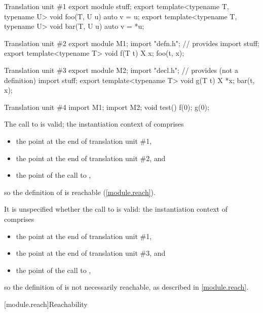 \pnum
\begin{example}
\begin{codeblocktu}{Translation unit \#1}
export module stuff;
export template<typename T, typename U> void foo(T, U u) { auto v = u; }
export template<typename T, typename U> void bar(T, U u) { auto v = *u; }
\end{codeblocktu}

\begin{codeblocktu}{Translation unit \#2}
export module M1;
import "defn.h";        // provides 
import stuff;
export template<typename T> void f(T t) {
  X x;
  foo(t, x);
}
\end{codeblocktu}

\begin{codeblocktu}{Translation unit \#3}
export module M2;
import "decl.h";        // provides  (not a definition)
import stuff;
export template<typename T> void g(T t) {
  X *x;
  bar(t, x);
}
\end{codeblocktu}

\begin{codeblocktu}{Translation unit \#4}
import M1;
import M2;
void test() {
  f(0);
  g(0);
}
\end{codeblocktu}
The call to  is valid;
the instantiation context of  comprises
\begin{itemize}
\item the point at the end of translation unit \#1,
\item the point at the end of translation unit \#2, and
\item the point of the call to ,
\end{itemize}
so the definition of  is reachable (\ref{module.reach}).

It is unspecified whether the call to  is valid:
the instantiation context of  comprises
\begin{itemize}
\item the point at the end of translation unit \#1,
\item the point at the end of translation unit \#3, and
\item the point of the call to ,
\end{itemize}
so the definition of  is not necessarily reachable,
as described in \ref{module.reach}.
\end{example}

[module.reach]{Reachability}

